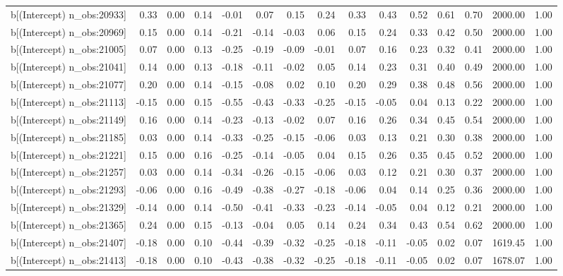 \begin{table}[ht]
\begin{tabular}{rrrrrrrrrrrrrrr}
  b[(Intercept) n\_obs:20933] & 0.33 & 0.00 & 0.14 & -0.01 & 0.07 & 0.15 & 0.24 & 0.33 & 0.43 & 0.52 & 0.61 & 0.70 & 2000.00 & 1.00 \\ 
  b[(Intercept) n\_obs:20969] & 0.15 & 0.00 & 0.14 & -0.21 & -0.14 & -0.03 & 0.06 & 0.15 & 0.24 & 0.33 & 0.42 & 0.50 & 2000.00 & 1.00 \\ 
  b[(Intercept) n\_obs:21005] & 0.07 & 0.00 & 0.13 & -0.25 & -0.19 & -0.09 & -0.01 & 0.07 & 0.16 & 0.23 & 0.32 & 0.41 & 2000.00 & 1.00 \\ 
  b[(Intercept) n\_obs:21041] & 0.14 & 0.00 & 0.13 & -0.18 & -0.11 & -0.02 & 0.05 & 0.14 & 0.23 & 0.31 & 0.40 & 0.49 & 2000.00 & 1.00 \\ 
  b[(Intercept) n\_obs:21077] & 0.20 & 0.00 & 0.14 & -0.15 & -0.08 & 0.02 & 0.10 & 0.20 & 0.29 & 0.38 & 0.48 & 0.56 & 2000.00 & 1.00 \\ 
  b[(Intercept) n\_obs:21113] & -0.15 & 0.00 & 0.15 & -0.55 & -0.43 & -0.33 & -0.25 & -0.15 & -0.05 & 0.04 & 0.13 & 0.22 & 2000.00 & 1.00 \\ 
  b[(Intercept) n\_obs:21149] & 0.16 & 0.00 & 0.14 & -0.23 & -0.13 & -0.02 & 0.07 & 0.16 & 0.26 & 0.34 & 0.45 & 0.54 & 2000.00 & 1.00 \\ 
  b[(Intercept) n\_obs:21185] & 0.03 & 0.00 & 0.14 & -0.33 & -0.25 & -0.15 & -0.06 & 0.03 & 0.13 & 0.21 & 0.30 & 0.38 & 2000.00 & 1.00 \\ 
  b[(Intercept) n\_obs:21221] & 0.15 & 0.00 & 0.16 & -0.25 & -0.14 & -0.05 & 0.04 & 0.15 & 0.26 & 0.35 & 0.45 & 0.52 & 2000.00 & 1.00 \\ 
  b[(Intercept) n\_obs:21257] & 0.03 & 0.00 & 0.14 & -0.34 & -0.26 & -0.15 & -0.06 & 0.03 & 0.12 & 0.21 & 0.30 & 0.37 & 2000.00 & 1.00 \\ 
  b[(Intercept) n\_obs:21293] & -0.06 & 0.00 & 0.16 & -0.49 & -0.38 & -0.27 & -0.18 & -0.06 & 0.04 & 0.14 & 0.25 & 0.36 & 2000.00 & 1.00 \\ 
  b[(Intercept) n\_obs:21329] & -0.14 & 0.00 & 0.14 & -0.50 & -0.41 & -0.33 & -0.23 & -0.14 & -0.05 & 0.04 & 0.12 & 0.21 & 2000.00 & 1.00 \\ 
  b[(Intercept) n\_obs:21365] & 0.24 & 0.00 & 0.15 & -0.13 & -0.04 & 0.05 & 0.14 & 0.24 & 0.34 & 0.43 & 0.54 & 0.62 & 2000.00 & 1.00 \\ 
  b[(Intercept) n\_obs:21407] & -0.18 & 0.00 & 0.10 & -0.44 & -0.39 & -0.32 & -0.25 & -0.18 & -0.11 & -0.05 & 0.02 & 0.07 & 1619.45 & 1.00 \\ 
  b[(Intercept) n\_obs:21413] & -0.18 & 0.00 & 0.10 & -0.43 & -0.38 & -0.32 & -0.25 & -0.18 & -0.11 & -0.05 & 0.02 & 0.07 & 1678.07 & 1.00 \\ 

\end{tabular}
\end{table}
